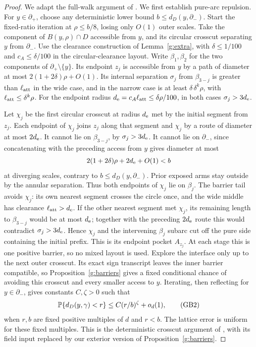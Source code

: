 \begin{proof}
We adapt the full-walk argument of \cite[Lemma~3.23, especially
equations (3.53) and (3.55)]{SSdiscrete}. We first establish pure-arc
repulsion. For \(y\in\partial_+\), choose
any deterministic lower bound \(b\leq d_D(y,\partial_-)\).
Start the fixed-ratio iteration at \(\rho\le b/8\), losing only
\(O(1)\) outer scales. Take the component of \(B(y,\rho)\cap D\)
accessible from \(y\), and its circular crosscut separating \(y\)
from \(\partial_-\). Use the clearance construction of
Lemma~\ref{g:extra}, with \(\delta\le1/100\) and
\(c_A\le\delta/100\) in the circular-clearance layout. Write
\(\beta_1,\beta_2\) for the two components of
\(\partial_+\setminus\{y\}\). Its endpoint \(z_j\) is accessible
from \(y\) by a path of diameter at most
\(2(1+2\delta)\rho+O(1)\). Its internal separation \(\sigma_j\)
from \(\beta_{3-j}\) is greater than \(\ell_{\rm att}\) in the
wide case, and in the narrow case is at least
\(\delta\,\delta^k\rho\), with
\(\ell_{\rm att}\le\delta^k\rho\). For the endpoint radius
\(d_{\rm e}=c_A\ell_{\rm att}\le\delta\rho/100\), in both cases
\(\sigma_j>3d_{\rm e}\).

Let \(\chi_j\) be the first circular crosscut at radius \(d_{\rm e}\)
met by the initial segment from \(z_j\). Each endpoint of \(\chi_j\)
joins \(z_j\) along that segment and \(\chi_j\) by a route of
diameter at most \(2d_{\rm e}\). It cannot lie on \(\beta_{3-j}\), by
\(\sigma_j>3d_{\rm e}\). It cannot lie on \(\partial_-\), since concatenating
with the preceding access from \(y\) gives diameter at most
\[
       2(1+2\delta)\rho+2d_{\rm e}+O(1)<b
\]
at diverging scales, contrary to \(b\le d_D(y,\partial_-)\).
Prior exposed arms stay outside by the annular separation.
Thus both endpoints of \(\chi_j\) lie on \(\beta_j\).
The barrier tail avoids \(\chi_j\): its own nearest segment crosses
the circle once, and the wide middle has clearance
\(\ell_{\rm att}>d_{\rm e}\). If the other nearest segment met \(\chi_j\),
its remaining length to \(\beta_{3-j}\) would be at most \(d_{\rm e}\);
together with the preceding \(2d_{\rm e}\) route this would contradict
\(\sigma_j>3d_{\rm e}\). Hence \(\chi_j\) and the intervening
\(\beta_j\) subarc cut off the pure side containing the initial
prefix. This is its endpoint pocket \(A_{z_j}\).
At each stage this is one positive barrier, so no mixed layout is used.
Explore the interface only up to the next outer crosscut. Its exact
sign transcript leaves the inner barrier compatible, so
Proposition~\ref{g:barriers} gives a fixed conditional chance of
avoiding this crosscut and every smaller access to \(y\).
Iterating, then reflecting for \(y\in\partial_-\), gives constants
\(C,\zeta>0\) such that
\[
 \mathbb P\{d_D(y,\gamma)<r\}
 \leq C(r/b)^\zeta+o_d(1),                         \tag{GB2}
\]
when \(r,b\) are fixed positive multiples of \(d\) and \(r<b\).
The lattice error is uniform for these fixed multiples. This is the
deterministic crosscut argument of
\cite[Theorem 3.22]{SSdiscrete}, with its field input replaced by
our exterior version of Proposition~\ref{g:barriers}.


\end{proof}
